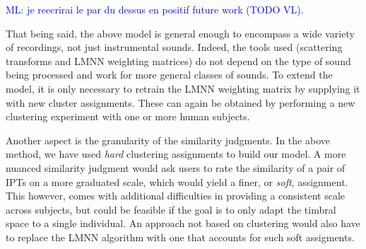 \documentclass{bmcart}
\newcommand{\ml}[1]{\textcolor{blue}{ML: #1}}
\begin{document}
\ml{je reecrirai le par du dessus en positif future work (TODO VL).}

That being said, the above model is general enough to encompass a wide variety of recordings, not just instrumental sounds.
Indeed, the tools used (scattering transforms and LMNN weighting matrices) do not depend on the type of sound being processed and work for more general classes of sounds.
To extend the model, it is only necessary to retrain the LMNN weighting matrix by supplying it with new cluster assignments.
These can again be obtained by performing a new clustering experiment with one or more human subjects.

Another aspect is the granularity of the similarity judgments.
In the above method, we have used \emph{hard} clustering assignments to build our model.
A more nuanced similarity judgment would ask users to rate the similarity of a pair of IPTs on a more graduated scale, which would yield a finer, or \emph{soft}, assignment.
This however, comes with additional difficulties in providing a consistent scale across subjects, but could be feasible if the goal is to only adapt the timbral space to a single individual.
An approach not based on clustering would also have to replace the LMNN algorithm with one that accounts for such soft assigments.

\end{document}
